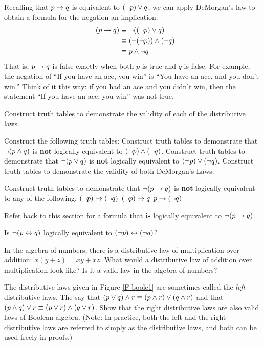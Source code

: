 Recalling that $p\rightarrow q$ is equivalent to $(\lnot p)\vee q$, we can apply DeMorgan's
law to obtain a formula for the negation an implication:
\begin{align*}
     \lnot(p\rightarrow q)&\equiv \lnot((\lnot p)\vee q)\\
                   &\equiv (\lnot(\lnot p))\wedge(\lnot q)\\
                   &\equiv p\wedge\lnot q\\
\end{align*}
That is, $p\rightarrow q$ is false exactly when both $p$ is true and $q$ is false.
For example, the negation of ``If you have an ace, you win'' is
``You have an ace, and you don't win.''  Think of it this way:  if you had an
ace and you didn't win, then the statement ``If you have an ace, you win''
was not true.


\begin{exercises}

\problem Construct truth tables to demonstrate the validity of
each of the distributive laws.

\problem Construct the following truth tables:
\ppart Construct truth tables to demonstrate that $\lnot (p \wedge q)$ is {\bf not}
logically equivalent to $(\lnot p) \wedge (\lnot q)$.
\ppart Construct truth tables to demonstrate that $\lnot (p \vee q)$ is {\bf not}
logically equivalent to $(\lnot p) \vee (\lnot q)$. 
\ppart Construct truth tables to demonstrate the validity of both
DeMorgan's Laws.

\problem Construct truth tables to demonstrate that $\lnot(p\rightarrow q)$ is {\bf not}
logically equivalent to any of the following.
\ppart $(\lnot p) \rightarrow (\lnot q)$
\ppart $(\lnot p) \rightarrow q$
\ppart $p \rightarrow (\lnot q)$

Refer back to this section for a formula that {\bf is} logically equivalent to
$\lnot(p\rightarrow q)$.

\problem Is $\lnot(p\leftrightarrow q)$ 
logically equivalent to $(\lnot p) \leftrightarrow (\lnot q)$?

\problem In the algebra of numbers, there is a distributive
law of multiplication over addition:  $x(y+z)=xy+xz$.
What would a distributive law of addition over multiplication
look like?  Is it a valid law in the algebra of numbers?

\problem The distributive laws given in Figure \ref{F-boole1} are sometimes
called the \emph{left} distributive laws.  The  say that $(p\vee q)\wedge r\equiv (p\wedge r)\vee (q\wedge r)$ and
that $(p\wedge q)\vee r\equiv (p\vee r)\wedge (q \vee r)$.  Show that
the right distributive laws are also valid laws of Boolean algebra.
(Note: In practice, both the left and the right distributive laws
are referred to simply as the distributive laws, and both can be used
freely in proofs.)


\end{exercises}
